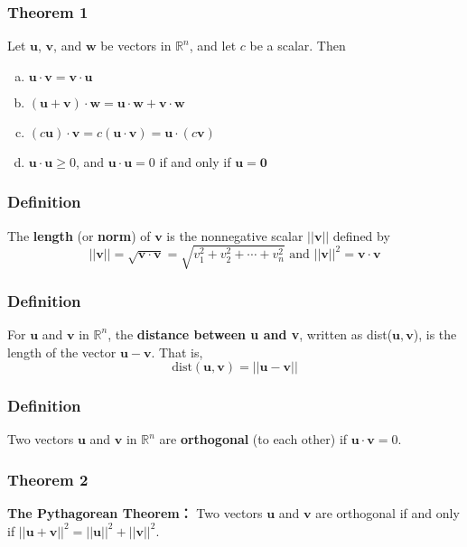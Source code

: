 \documentclass[letterpaper,11pt]{article}
\begin{document}
			\subsubsection{Theorem 1}
				Let $\mathbf{u}$, $\mathbf{v}$, and $\mathbf{w}$ be vectors in $\mathbb{R}^n$, and let $c$ be a scalar. Then
				\begin{enumerate}[a.]
					\item $\mathbf{u\cdot v}=\mathbf{v\cdot u}$
					\item $(\mathbf{u+v})\cdot\mathbf{w}=\mathbf{u}\cdot\mathbf{w}+\mathbf{v}\cdot\mathbf{w}$
					\item $(c\mathbf{u})\cdot\mathbf{v}=c(\mathbf{u}\cdot\mathbf{v})=\mathbf{u}\cdot(c\mathbf{v})$
					\item $\mathbf{u}\cdot\mathbf{u}\geq 0$, and $\mathbf{u}\cdot\mathbf{u}=0$ if and only if $\mathbf{u}=\mathbf{0}$
				\end{enumerate}
			\subsubsection{Definition}
				The \textbf{length} (or \textbf{norm}) of $\mathbf{v}$ is the nonnegative scalar $||\mathbf{v}||$ defined by
				\begin{equation}
					||\mathbf{v}||=\sqrt{\mathbf{v\cdot v}}=\sqrt{v^2_1+v^2_2+\cdots+v^2_n}\textrm{ and }||\mathbf{v}||^2=\mathbf{v\cdot v}
				\end{equation}
			\subsubsection{Definition}
				For $\mathbf{u}$ and $\mathbf{v}$ in $\mathbb{R}^n$, the \textbf{distance between u and v}, written as dist($\mathbf{u,v}$), is the length of the vector $\mathbf{u}-\mathbf{v}$. That is,
				\begin{equation}
					\mathrm{dist}(\mathbf{u,v})=||\mathbf{u}-\mathbf{v}||
				\end{equation}
			\subsubsection{Definition}
				Two vectors $\mathbf{u}$ and $\mathbf{v}$ in $\mathbb{R}^n$ are \textbf{orthogonal} (to each other) if $\mathbf{u\cdot v}=0$.
			\subsubsection{Theorem 2}
				\textbf{The Pythagorean Theorem：} Two vectors $\mathbf{u}$ and $\mathbf{v}$ are orthogonal if and only if $||\mathbf{u}+\mathbf{v}||^2=||\mathbf{u}||^2+||\mathbf{v}||^2$.
\end{document}
